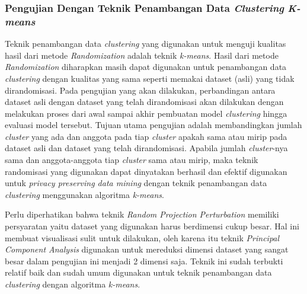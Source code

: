 \subsubsection{Pengujian Dengan Teknik Penambangan Data \textit{Clustering} \textit{K-means}}
\label{subsubsec:analisis-kmeans}

Teknik penambangan data \textit{clustering} yang digunakan untuk menguji kualitas hasil dari metode \textit{Randomization} adalah teknik \textit{k-means}. Hasil dari metode \textit{Randomization} diharapkan masih dapat digunakan untuk penambangan data \textit{clustering} dengan kualitas yang sama seperti memakai dataset (asli) yang tidak dirandomisasi. Pada pengujian yang akan dilakukan, perbandingan antara dataset asli dengan dataset yang telah dirandomisasi akan dilakukan dengan melakukan proses dari awal sampai akhir pembuatan model \textit{clustering} hingga evaluasi model tersebut. Tujuan utama pengujian adalah membandingkan jumlah \textit{cluster} yang ada dan anggota pada tiap \textit{cluster} apakah sama atau mirip pada dataset asli dan dataset yang telah dirandomisasi. Apabila jumlah \textit{cluster}-nya sama dan anggota-anggota tiap \textit{cluster} sama atau mirip, maka teknik randomisasi yang digunakan dapat dinyatakan berhasil dan efektif digunakan untuk \textit{privacy preserving data mining} dengan teknik penambangan data \textit{clustering} menggunakan algoritma \textit{k-means}.

Perlu diperhatikan bahwa teknik \textit{Random Projection Perturbation} memiliki persyaratan yaitu dataset yang digunakan harus berdimensi cukup besar. Hal ini membuat visualisasi sulit untuk dilakukan, oleh karena itu teknik \textit{Principal Component Analysis} digunakan untuk mereduksi dimensi dataset yang sangat besar dalam pengujian ini menjadi 2 dimensi saja. Teknik ini sudah terbukti relatif baik dan sudah umum digunakan untuk teknik penambangan data \textit{clustering} dengan algoritma \textit{k-means}.


